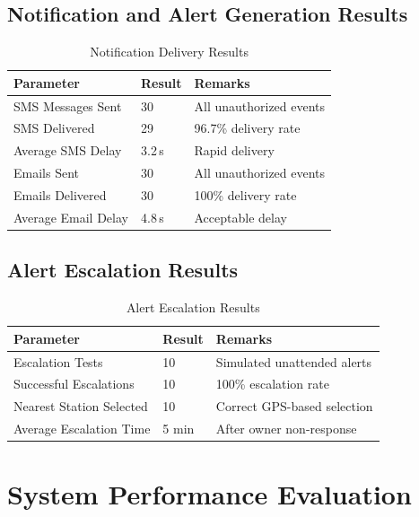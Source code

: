 \documentclass[12pt,a4paper,oneside]{report}
\begin{document}
\subsection{Notification and Alert Generation Results}

\begin{table}[htbp]
  \centering
  \caption{Notification Delivery Results}
  {\small
  \begin{tabular}{|p{5.00cm}|p{3.00cm}|p{6.00cm}|}
    \hline
    \textbf{Parameter} & \textbf{Result} & \textbf{Remarks} \\
    \hline
    SMS Messages Sent       & 30        & All unauthorized events \\
    SMS Delivered           & 29        & 96.7\% delivery rate \\
    Average SMS Delay       & 3.2\,s    & Rapid delivery \\
    Emails Sent             & 30        & All unauthorized events \\
    Emails Delivered        & 30        & 100\% delivery rate \\
    Average Email Delay     & 4.8\,s    & Acceptable delay \\
    \hline
  \end{tabular}
  }
\end{table}

\subsection{Alert Escalation Results}

\begin{table}[htbp]
  \centering
  \caption{Alert Escalation Results}
  {\small
  \begin{tabular}{|p{5.00cm}|p{3.00cm}|p{6.00cm}|}
    \hline
    \textbf{Parameter} & \textbf{Result} & \textbf{Remarks} \\
    \hline
    Escalation Tests        & 10    & Simulated unattended alerts \\
    Successful Escalations  & 10    & 100\% escalation rate \\
    Nearest Station Selected & 10   & Correct GPS-based selection \\
    Average Escalation Time & 5 min & After owner non-response \\
    \hline
  \end{tabular}
  }
\end{table}

\section{System Performance Evaluation}
\end{document}
